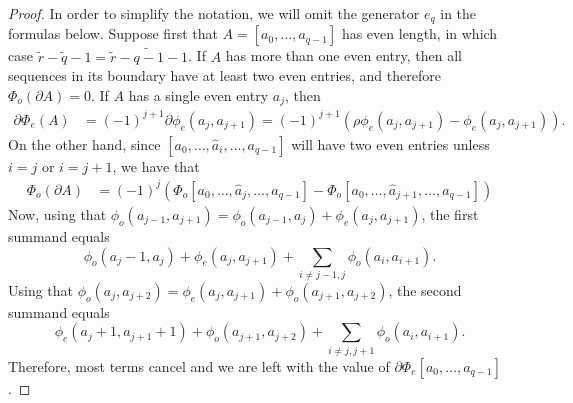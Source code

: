 \begin{proof} In order to simplify the notation, we will omit the generator $e_q$ in the formulas below.
	Suppose first that $A = [a_0,\ldots,a_{q-1}]$ has even length, in which case $\tilde{r}-\tilde{q}-1 = \tilde{r}-\widetilde{q-1}-1$. If $A$ has more than one even entry, then all sequences in its boundary have at least two even entries, and therefore $\Phi_o(\partial A) = 0$. If $A$ has a single even entry $a_j$, then
	\begin{align*}
		\partial \Phi_e(A) &= (-1)^{j+1}\partial \phi_e(a_j,a_{j+1}) = (-1)^{j+1}\left(\rho\phi_e(a_j,a_{j+1}
		) - \phi_e(a_j,a_{j+1})\right).
	\end{align*}
	On the other hand, since $[a_0,\ldots,\hat{a}_i,\ldots,a_{q-1}]$ will have two even entries unless $i=j$ or $i=j+1$, we have that
	\begin{align*}
		\Phi_o(\partial A)
		&= (-1)^{j}\left(\Phi_o [a_0,\ldots,\hat{a}_j,\ldots,a_{q-1}]-\Phi_o [a_0,\ldots,\hat{a}_{j+1},\ldots,a_{q-1}]\right)
	\end{align*}
	Now, using that $\phi_o(a_{j-1},a_{j+1}) = \phi_o(a_{j-1},a_j) + \phi_e(a_j,a_{j+1})$, the first summand equals
	\[
	\phi_o(a_j-1,a_j) + \phi_e(a_j,a_{j+1})+\sum_{i\neq j-1,j} \phi_o(a_i,a_{i+1}).
	\]
	Using that $\phi_o(a_{j},a_{j+2}) = \phi_e(a_j,a_{j+1})+\phi_o(a_{j+1},a_{j+2})$, the second summand equals
	\[
	\phi_e(a_j+1,a_{j+1}+1) + \phi_o(a_{j+1},a_{j+2})+\sum_{i\neq j,j+1} \phi_o(a_i,a_{i+1}).
	\]
	Therefore, most terms cancel and we are left with the value of $\partial \Phi_e[a_0,\ldots,a_{q-1}]$.


\end{proof}
